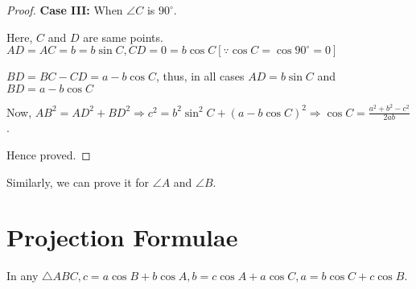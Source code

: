 \begin{proof}
  \noindent\textbf{Case III:} When $\angle C$ is $90^\circ$.
  \begin{center}
  \end{center}
  Here, $C$ and $D$ are same points. $AD = AC = b = b\sin C, CD = 0 = b\cos C [\because \cos C = \cos90^\circ = 0]$

  \noindent $BD = BC - CD = a - b\cos C$, thus, in all cases $AD = b\sin C$ and $BD = a - b\cos C$

  \noindent Now, $AB^2 = AD^2 + BD^2 \Rightarrow c^2 = b^2\sin^2C + (a - b\cos C)^2 \Rightarrow \cos C = \frac{a^2 + b^2 - c^2}{2ab}$.

  Hence proved.
\end{proof}
Similarly, we can prove it for $\angle A$ and $\angle B$.

\section{Projection Formulae}
\begin{theorem}
  In any $\triangle ABC, c = a\cos B + b\cos A, b = c\cos A + a\cos C, a = b\cos C + c\cos B$.
\end{theorem}

